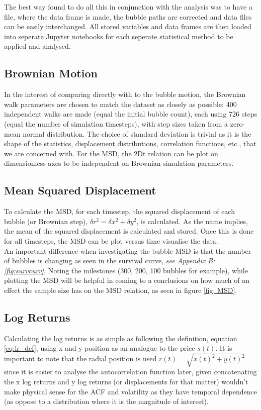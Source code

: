The best way found to do all this in conjunction with the analysis was to have a  file, where the data frame is made, the bubble paths are corrected and data files can be easily interchanged. All stored variables and data frames are then loaded into seperate Jupyter notebooks for each seperate statistical method to be applied and analysed.\\

\subsection{Brownian Motion}
In the interest of comparing directly with to the bubble motion, the Brownian walk parameters are chosen to match the dataset as closely as possible: 400 independent walks are made (equal the initial bubble count), each using 726 steps (equal the number of simulation timesteps), with step sizes taken from a zero-mean normal distribution. The choice of standard deviation is trivial as it is the shape of the statistics, displacement distributions, correlation functions, etc., that we are concerned with. For the MSD, the 2Dt relation can be plot on dimensionless axes to be independent on Brownian simulation parameters.\\

\subsection{Mean Squared Displacement}
To calculate the MSD, for each timestep, the squared displacement of each bubble (or Brownian step), $\delta r^2 = \delta x^2 + \delta y^2$, is calculated. As the name implies, the mean of the squared displacement is calculated and stored. Once this is done for all timesteps, the MSD can be plot versus time visualise the data.\\

An important difference when investigating the bubble MSD is that the number of bubbles is changing as seen in the survival curve, \textit{see Appendix B: \ref{fig:survcurv}}. Noting the milestones (300, 200, 100 bubbles for example), while plotting the MSD will be helpful in coming to a conclusions on how much of an effect the sample size has on the MSD relation, as seen in figure \ref{fig: MSD}.\\

\subsection{Log Returns}
Calculating the log returns is as simple as following the definition, equation \ref{eq:lr_def}, using x and y position as an analogue to the price $s(t)$. It is important to note that the radial position is used $r(t) = \sqrt{x(t)^2 + y(t)^2}$ since it is easier to analyse the autocorrelation function later, given concatenating the x log returns and y log returns (or displacements for that matter) wouldn't make physical sense for the ACF and volatility as they have temporal dependence (as oppose to a distribution where it is the magnitude of interest).\\

